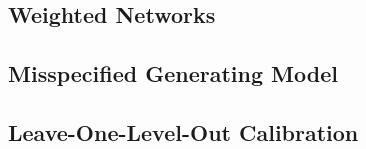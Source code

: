 \documentclass[11pt, letterpaper]{article}
\numberwithin{equation}{section}
\begin{document}
\subsection{Weighted Networks}

\subsection{Misspecified Generating Model}

\subsection{Leave-One-Level-Out Calibration}
\begin{table}[ht]
\centering\small
\caption{Leave-one-level-out validation: the floor is recalibrated with each network size, density or community-count level excluded, then applied to the held-out level. Held-out fits whose stability bin has no calibration fits at or below it have no floor and are counted in the fourth column; the share above the floor is computed among the remaining fits.}
\label{tab:app_stability_lolo}

\end{table}
\end{document}
